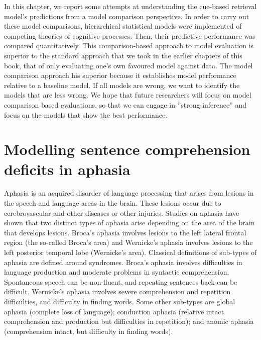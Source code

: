 \documentclass{cambridge7A}\usepackage[]{graphicx}\usepackage[]{color}
\begin{document}
In this chapter, we report some attempts at understanding the cue-based retrieval model's predictions from a model comparison perspective. In order to carry out these model comparisons,  hierarchical statistical models were implemented of competing theories of cognitive processes. Then, their predictive performance was compared quantitatively. This comparison-based approach to model evaluation is superior to the standard approach that we took in the earlier chapters of this book, that of only evaluating one's own favoured model against data. The model comparison approach his superior because it establishes model performance relative to a baseline model. If all models are wrong, we want to identify the models that are less wrong. We hope that future researchers will focus on model comparison based evaluations, so that we can engage in ''strong inference'' \citep{platt1964strong} and focus on the models that show the best performance.      


\chapter{Modelling sentence comprehension deficits in aphasia} \label{c06}

Aphasia  is an acquired disorder of language processing that arises from lesions in the speech and language areas in the brain. These lesions occur due to cerebrovascular and other  diseases or  other injuries. Studies on aphasia have shown that two distinct types of aphasia arise depending on the area of the brain that develops lesions. Broca's aphasia involves lesions to the left lateral frontal region (the so-called Broca's area) and  Wernicke's aphasia involves lesions to the left posterior temporal lobe (Wernicke's area). Classical definitions of sub-types of aphasia are defined around syndromes.
Broca's aphasia  involves difficulties in language production and moderate problems in syntactic comprehension. Spontaneous speech can be non-fluent, and  repeating sentences back can be difficult. 
Wernicke's aphasia involves severe comprehension and repetition difficulties, and difficulty in finding words. 
Some other sub-types are global aphasia (complete loss of language); conduction aphasia (relative intact comprehension and production but difficulties in repetition); and anomic aphasia (comprehension intact, but difficulty in finding words).
\end{document}
